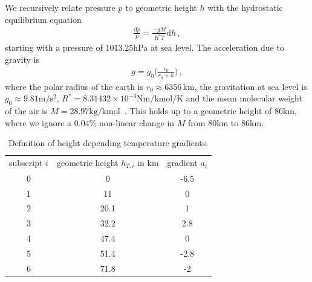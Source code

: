 We recursively relate pressure $p$ to geometric height $h$ with the hydrostatic equilibrium equation
\begin{align}
	\frac{\text{d}p}{p} = \frac{- g M}{R^* T} \text{d} h \, ,\label{eq:hydr}
\end{align}
starting with a pressure of $1013.25$hPa at sea level.
The acceleration due to gravity is
\begin{align}
	g = g_0 \Bigg( \frac{r_0}{r_0 + h} \Bigg) \, ,
\end{align}
where the polar radius of the earth is $r_0 \approx 6356 \, \text{km}$, the gravitation at sea level is $g_0 \approx 9.81 \text{m}/\text{s}^2$, $R^* = 8.31432 \times 10^{-3} \text{Nm} / \text{kmol} / \text{K}$ and the mean molecular weight of the air is $M = 28.97 \text{kg/kmol}$~\cite{atmosphere1976us}.
This holds up to a geometric height of $86$km, where we ignore a $0.04\%$ non-linear change in $M$ from $80$km to $86$km.
\begin{table}
	\centering
	\begin{tabular}{ |c||c|c|  }
		\hline
		subscript $i$ & geometric height $h_{T,i}$ in km&gradient $a_i$\\
		\hhline{|=||=|=|}
		0& 0 & -6.5\\
		1& 11 & 0\\
		2& 20.1& 1\\
		3& 32.2& 2.8\\
		4& 47.4& 0\\
		5& 51.4& -2.8\\
		6& 71.8& -2\\
		\hline
	\end{tabular}
	\caption[Height depending temperature gradients]{Definition of height depending temperature gradients.}
	\label{tab:tempGrad}
\end{table}

